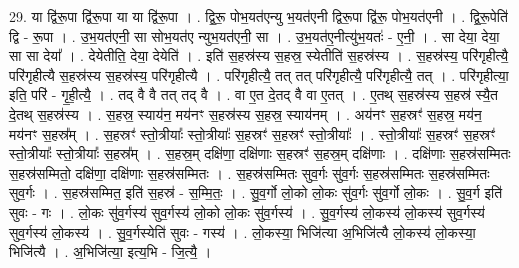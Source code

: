 \documentclass[17pt]{extarticle}
\begin{document}
29. या द्वि॑रू॒पा द्वि॑रू॒पा या या द्वि॑रू॒पा । . द्वि॒रू॒ पोभ॒यत॑एन्यु भ॒यत॑एनी द्विरू॒पा द्वि॑रू॒ पोभ॒यत॑एनी । . द्वि॒रू॒पेति॑ द्वि - रू॒पा । . उ॒भ॒यत॑एनी॒ सा सोभ॒यत॑ए न्युभ॒यत॑एनी॒ सा । . उ॒भ॒यत॑ए॒नीत्यु॑भ॒यतः॑ - ए॒नी॒ । . सा देया॒ देया॒ सा सा देया᳚ । . देयेतीति॒ देया॒ देयेति॑ । . इति॑ स॒हस्र॑स्य स॒हस्र॒ स्येतीति॑ स॒हस्र॑स्य । . स॒हस्र॑स्य॒ परि॑गृहीत्यै॒ परि॑गृहीत्यै स॒हस्र॑स्य स॒हस्र॑स्य॒ परि॑गृहीत्यै । . परि॑गृहीत्यै॒ तत् तत् परि॑गृहीत्यै॒ परि॑गृहीत्यै॒ तत् । . परि॑गृहीत्या॒ इति॒ परि॑ - गृ॒ही॒त्यै॒ । . तद् वै वै तत् तद् वै । . वा ए॒त दे॒तद् वै वा ए॒तत् । . ए॒तथ् स॒हस्र॑स्य स॒हस्र॑ स्यै॒त दे॒तथ् स॒हस्र॑स्य । . स॒हस्र॒ स्याय॑न॒ मय॑नꣳ स॒हस्र॑स्य स॒हस्र॒ स्याय॑नम् । . अय॑नꣳ स॒हस्रꣳ॑ स॒हस्र॒ मय॑न॒ मय॑नꣳ स॒हस्र᳚म् । . स॒हस्रꣳ॑ स्तो॒त्रीयाः᳚ स्तो॒त्रीयाः᳚ स॒हस्रꣳ॑ स॒हस्रꣳ॑ स्तो॒त्रीयाः᳚ । . स्तो॒त्रीयाः᳚ स॒हस्रꣳ॑ स॒हस्रꣳ॑ स्तो॒त्रीयाः᳚ स्तो॒त्रीयाः᳚ स॒हस्र᳚म् । . स॒हस्र॒म् दक्षि॑णा॒ दक्षि॑णाः स॒हस्रꣳ॑ स॒हस्र॒म् दक्षि॑णाः । . दक्षि॑णाः स॒हस्र॑सम्मितः स॒हस्र॑सम्मितो॒ दक्षि॑णा॒ दक्षि॑णाः स॒हस्र॑सम्मितः । . स॒हस्र॑सम्मितः सुव॒र्गः सु॑व॒र्गः स॒हस्र॑सम्मितः स॒हस्र॑सम्मितः सुव॒र्गः । . स॒हस्र॑सम्मित॒ इति॑ स॒हस्र॑ - स॒म्मि॒तः॒ । . सु॒व॒र्गो लो॒को लो॒कः सु॑व॒र्गः सु॑व॒र्गो लो॒कः । . सु॒व॒र्ग इति॑ सुवः - गः । . लो॒कः सु॑व॒र्गस्य॑ सुव॒र्गस्य॑ लो॒को लो॒कः सु॑व॒र्गस्य॑ । . सु॒व॒र्गस्य॑ लो॒कस्य॑ लो॒कस्य॑ सुव॒र्गस्य॑ सुव॒र्गस्य॑ लो॒कस्य॑ । . सु॒व॒र्गस्येति॑ सुवः - गस्य॑ । . लो॒कस्या॒ भिजि॑त्या अ॒भिजि॑त्यै लो॒कस्य॑ लो॒कस्या॒ भिजि॑त्यै । . अ॒भिजि॑त्या॒ इत्य॒भि - जि॒त्यै॒ । \newline
\end{document}
